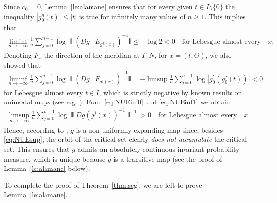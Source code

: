 \documentclass[reqno,12pt,a4paper]{amsart}
\theoremstyle{plain}
\theoremstyle{definition}
\providecommand{\Norm}[1]{\interleave#1\interleave}
\begin{document}
Since $c_0=0$, Lemma~\ref{le:alamane} ensures that for every
given $t\in I\setminus\{0\}$
the inequality
$|g_0^n(t)|\le|t|$ is true for infinitely many values of
$n\ge1$. This implies that
\begin{align}
  \label{eq:NUEinf0}
  \liminf_{n\to+\infty}
  \frac1n\sum_{j=0}^{n-1}\log\Norm{(Dg\mid
    E_{g^j(x)})^{-1}} \le -\log 2<0 \quad\text{for Lebesgue
    almost every}\quad x.
\end{align}
Denoting $F_x$ the direction of the meridian at $T_x N$, for
$x=(t,\Theta)$, we also showed that
\begin{align}
  \label{eq:NUEinf1}
  \liminf_{n\to+\infty}
  \frac1n\sum_{j=0}^{n-1}\log\Norm{(Dg\mid F_{g^j(x)})^{-1}}
  =
  -\limsup\frac1n\sum_{j=0}^{n-1}\log|g_0^\prime(g_0^j(t))|<0
\end{align}
for Lebesgue almost every $t\in I$, which is strictly
negative by known results on unimodal maps (see
e.g. \cite{MS93}). From \eqref{eq:NUEinf0} and
\eqref{eq:NUEinf1} we obtain
\begin{align}\label{eq:NUEsup}
  \limsup_{n\to+\infty} \frac 1 n \sum_{j= 0}^{n-1} \log
  \Norm{Dg(g^j(x))^{-1}}^{-1} > 0 \quad\text{for Lebesgue
    almost every}\quad x.
\end{align}
Hence, according to \cite{Pinheiro05}, $g$ is a
non-uniformly expanding map since, besides
\eqref{eq:NUEsup}, the orbit of the critical set clearly
\emph{does not accumulate} the critical set.  This ensures
that $g$ admits an absolutely continuous invariant
probability measure, which is unique because $g$ is a
transitive map (see the proof of Lemma~\ref{le:alamane}
below).

To complete the proof of Theorem~\ref{thm:seg}, we are left
to prove Lemma~\ref{le:alamane}.
\end{document}
